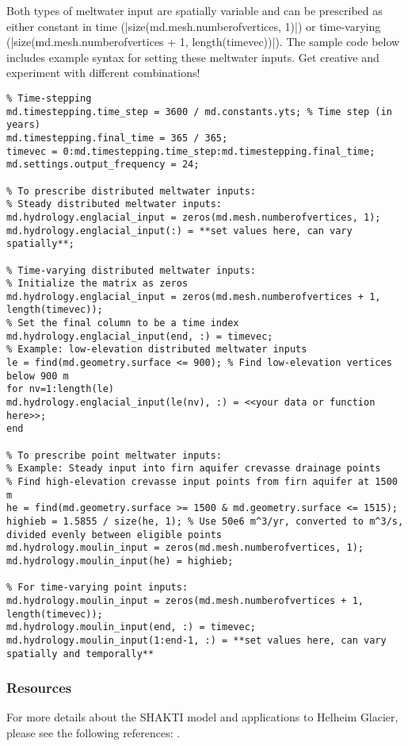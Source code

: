 Both types of meltwater input are spatially variable and can be prescribed as either constant in time (\lstinlinebg|size(md.mesh.numberofvertices, 1)|) or time-varying (\lstinlinebg|size(md.mesh.numberofvertices + 1, length(timevec))|). The sample code below includes example syntax for setting these meltwater inputs. Get creative and experiment with different combinations!
\begin{lstlisting}
% Time-stepping
md.timestepping.time_step = 3600 / md.constants.yts; % Time step (in years)
md.timestepping.final_time = 365 / 365;
timevec = 0:md.timestepping.time_step:md.timestepping.final_time;
md.settings.output_frequency = 24;

% To prescribe distributed meltwater inputs:
% Steady distributed meltwater inputs:
md.hydrology.englacial_input = zeros(md.mesh.numberofvertices, 1);
md.hydrology.englacial_input(:) = **set values here, can vary spatially**;

% Time-varying distributed meltwater inputs:
% Initialize the matrix as zeros
md.hydrology.englacial_input = zeros(md.mesh.numberofvertices + 1, length(timevec));
% Set the final column to be a time index
md.hydrology.englacial_input(end, :) = timevec;
% Example: low-elevation distributed meltwater inputs
le = find(md.geometry.surface <= 900); % Find low-elevation vertices below 900 m
for nv=1:length(le)
md.hydrology.englacial_input(le(nv), :) = <<your data or function here>>;
end

% To prescribe point meltwater inputs:
% Example: Steady input into firn aquifer crevasse drainage points
% Find high-elevation crevasse input points from firn aquifer at 1500 m
he = find(md.geometry.surface >= 1500 & md.geometry.surface <= 1515);
highieb = 1.5855 / size(he, 1); % Use 50e6 m^3/yr, converted to m^3/s, divided evenly between eligible points
md.hydrology.moulin_input = zeros(md.mesh.numberofvertices, 1);
md.hydrology.moulin_input(he) = highieb;

% For time-varying point inputs:
md.hydrology.moulin_input = zeros(md.mesh.numberofvertices + 1, length(timevec));
md.hydrology.moulin_input(end, :) = timevec;
md.hydrology.moulin_input(1:end-1, :) = **set values here, can vary spatially and temporally**
\end{lstlisting}

\subsubsection{Resources}
For more details about the SHAKTI model and applications to Helheim Glacier, please see the
following references: \cite{Sommers2018,Sommers2023,Sommers2024}.

\clearpage %
